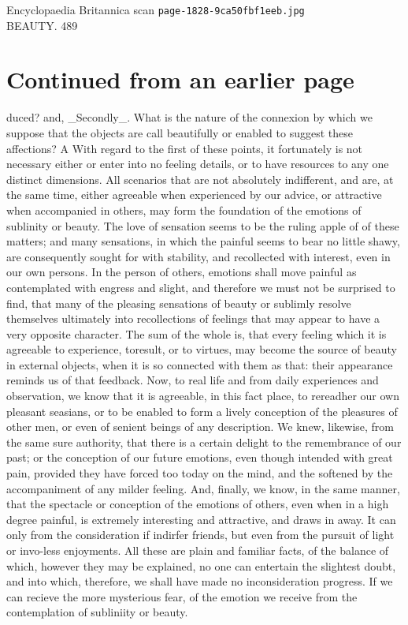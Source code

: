 \documentclass{article}
\begin{document}
\begin{center}
{\Large Encyclopaedia Britannica scan \texttt{page-1828-9ca50fbf1eeb.jpg}}\\[0.5em]
BEAUTY. 489
\end{center}
\section*{Continued from an earlier page}
duced? and, \_Secondly\_. What is the nature of the connexion by which we suppose that the objects are call beautifully or enabled to suggest these affections? A With regard to the first of these points, it fortunately is not necessary either or enter into no feeling details, or to have resources to any one distinct dimensions. All scenarios that are not absolutely indifferent, and are, at the same time, either agreeable when experienced by our advice, or attractive when accompanied in others, may form the foundation of the emotions of sublinity or beauty. The love of sensation seems to be the ruling apple of of these matters; and many sensations, in which the painful seems to bear no little shawy, are consequently sought for with stability, and recollected with interest, even in our own persons. In the person of others, emotions shall move painful as contemplated with engress and slight, and therefore we must not be surprised to find, that many of the pleasing sensations of beauty or sublimly resolve themselves ultimately into recollections of feelings that may appear to have a very opposite character. The sum of the whole is, that every feeling which it is agreeable to experience, toresult, or to virtues, may become the source of beauty in external objects, when it is so connected with them as that: their appearance reminds us of that feedback. Now, to real life and from daily experiences and observation, we know that it is agreeable, in this fact place, to rereadher our own pleasant seasians, or to be enabled to form a lively conception of the pleasures of other men, or even of senient beings of any description. We knew, likewise, from the same sure authority, that there is a certain delight to the remembrance of our past; or the conception of our future emotions, even though intended with great pain, provided they have forced too today on the mind, and the softened by the accompaniment of any milder feeling. And, finally, we know, in the same manner, that the spectacle or conception of the emotions of others, even when in a high degree painful, is extremely interesting and attractive, and draws in away. It can only from the consideration if indirfer friends, but even from the pursuit of light or invo-less enjoyments. All these are plain and familiar facts, of the balance of which, however they may be explained, no one can entertain the slightest doubt, and into which, therefore, we shall have made no inconsideration progress. If we can recieve the more mysterious fear, of the emotion we receive from the contemplation of subliniity or beauty.
\end{document}
